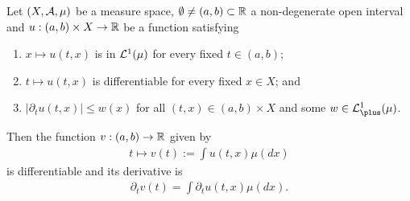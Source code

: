 \begin{thm}
	\label{thm:differentiability-lemma}
	
	Let $(X, \mathcal{A}, \mu)$ be a measure space, $\emptyset \neq (a, b) \subset \mathbb{R}$ a non-degenerate open interval and $u: (a, b) \times X \to \mathbb{R}$ be a function satisfying
	\begin{enumerate}
		\item $x \mapsto u(t, x)$ is in $\mathcal{L}^1(\mu)$ for every fixed $t \in (a, b)$;
		\item $t \mapsto u(t, x)$ is differentiable for every fixed $x \in X$; and
		\item $|\partial_t u(t, x)| \leq w(x)$ for all $(t, x) \in (a, b) \times X$ and some $w \in \calL^1_\plus(\mu)$.
	\end{enumerate}
	Then the function $v: (a,b) \to \mathbb{R}$ given by
	\begin{align}
		t \mapsto v(t) := \int u(t, x) \mu(dx)
	\end{align}
	is differentiable and its derivative is
	\begin{align}
		\partial_t v(t) = \int \partial_t u(t, x) \mu(dx).
	\end{align}
\end{thm}